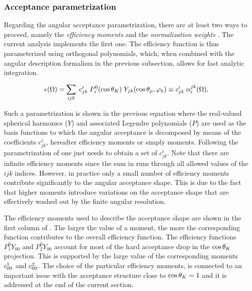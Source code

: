 \subsubsection{Acceptance parametrization}
\label{Acceptance parametrization}
Regarding the angular acceptance parametrization, there are at least two ways to proceed,
namely the \emph{efficiency moments} \cite{jeroenThesis} and the \emph{normalization weights} \cite{tristanThesis,jeroenThesis}.
The current analysis implements the first one. The efficiency function is thus parameterized using orthogonal polynomials,
which, when combined with the angular description formalism in the previous subsection, allows for fast analytic
integration.

\begin{equation}
  \centering
  \epsilon(\Omega) = \sum_{ijk} \; \moment{i}{j}{k} \; P_i^0(\cos\thetaK) \; Y_{jk}(\cos\thetamu,\phihel) \equiv \moment{i}{j}{k} \; \effbase,
  \label{eff_func}
\end{equation}

\noindent Such a parametrization is shown in the previous equation where the real-valued spherical harmonics ($Y$) and associated Legendre polynomials ($P$) are used as the basis
functions to which the angular acceptance is decomposed by means of the coefficients $c^i_{jk}$, hereafter efficiency moments or simply moments.
Following the parametrization of  one just needs to obtain a set of $c^i_{jk}$. Note that there are \aprior infinite efficiency moments
since the sum in  runs through all allowed values of the $ijk$ indices. However, in practice only a small number of efficiency moments
contribute significantly to the angular acceptance shape. This is due to the fact that higher moments introduce
variations on the acceptance shape that are effectively washed out by the finite angular resolution.

The efficiency moments used to describe the acceptance shape are shown in the first column of .
The larger the value of a moment, the more the corresponding function contributes to the overall efficiency function.
The efficiency functions $P_1^0Y_{00}$ and $P_2^0Y_{00}$ account for most of the hard acceptance drop in the $\cos\theta_{K}$ projection.
This is supported by the large value of the corresponding moments $c^{1}_{00}$ and $c^{2}_{00}$.
The choice of the particular efficiency moments, is connected to an important
issue with the acceptance structure close to $\cos\theta_{K}=1$ and it is addressed at the end of the current section.

